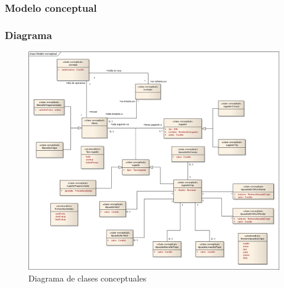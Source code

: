 \subsubsection{Modelo conceptual}

\subsubsection{Diagrama}
\begin{figure}[p!hbt]
		\centering
		\includegraphics[angle=90, width=1.0\textwidth]{../img/ModeloConceptual.png}
		\caption{Diagrama de clases conceptuales}
\end{figure}


